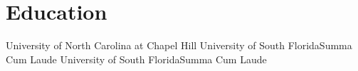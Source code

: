 \section{Education}
		{University of North Carolina at Chapel Hill}{}{}{}
		{University of South Florida}{Summa Cum Laude}{}{}
		{University of South Florida}{Summa Cum Laude}{}{}